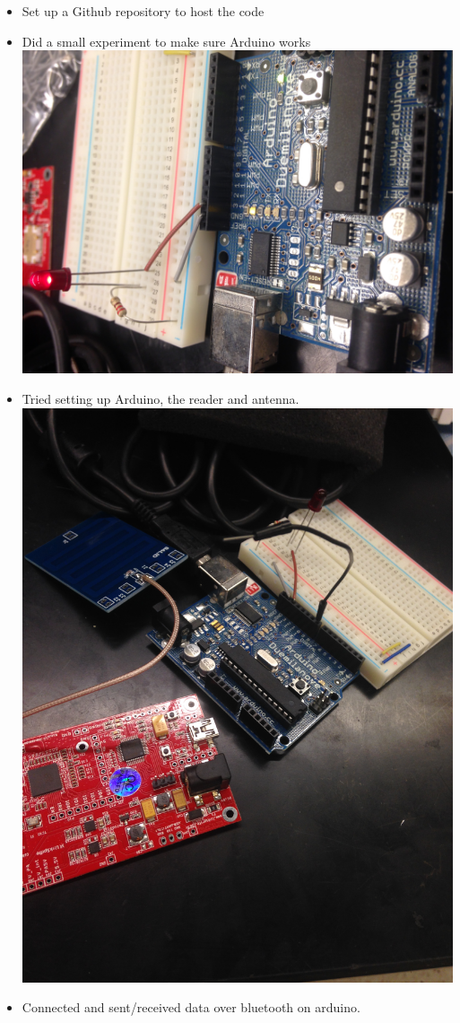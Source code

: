 \documentclass{article}
\begin{document}
	\begin{itemize}
	\item Set up a Github repository to host the code
	\item Did a small experiment to make sure Arduino works\\
		\includegraphics[scale=0.09,angle=-90]{works.JPG}

	\item Tried setting up Arduino, the reader and antenna. \\
	 \includegraphics[scale=0.1,angle=-90]{IMG_2848.JPG}

	 \item Connected and sent/received data over bluetooth on arduino.


\end{itemize}
\end{document}
